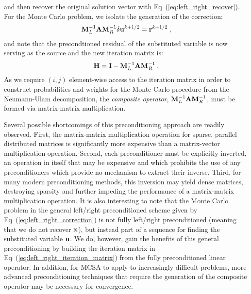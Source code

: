 and then recover the original solution vector with
Eq~(\ref{eq:left_right_recover}). For the Monte Carlo problem, we
isolate the generation of the correction:
\begin{equation}
  \mathbf{M}_L^{-1}\mathbf{A}\mathbf{M}_R^{-1}\delta\mathbf{u}^{k+1/2} = \mathbf{r}^{k+1/2}\:,
  \label{eq:left_right_correction}
\end{equation}
and note that the precondtioned residual of the substituted variable
is now serving as the source and the new iteration matrix is:
\begin{equation}
  \mathbf{H} = \mathbf{I} - \mathbf{M}_L^{-1}\mathbf{A}\mathbf{M}_R^{-1}\:.
  \label{eq:left_right_iteration_matrix}
\end{equation}
As we require $(i,j)$ element-wise access to the iteration matrix in
order to construct probabilities and weights for the Monte Carlo
procedure from the Neumann-Ulam decomposition, the \textit{composite
  operator}, $\mathbf{M}_L^{-1}\mathbf{A}\mathbf{M}_R^{-1}$, must be formed via
matrix-matrix multiplication. 

Several possible shortcomings of this preconditioning approach are
readily observed. First, the matrix-matrix multiplication operation
for sparse, parallel distributed matrices is significantly more
expensive than a matrix-vector multiplication operation. Second, each
preconditioner must be explicitly inverted, an operation in itself
that may be expensive and which prohibits the use of any
preconditioners which provide no mechanism to extract their
inverse. Third, for many modern preconditioning methods, this
inversion may yield dense matrices, destroying sparsity and further
impeding the performance of a matrix-matrix multiplication
operation. It is also interesting to note that the Monte Carlo problem
in the general left/right preconditioned scheme given by
Eq~(\ref{eq:left_right_correction}) is not fully left/right
preconditioned (meaning that we do not recover $\mathbf{x}$), but instead
part of a sequence for finding the substituted variable $\mathbf{u}$. We
do, however, gain the benefits of this general preconditioning by
building the iteration matrix in
Eq~(\ref{eq:left_right_iteration_matrix}) from the fully
preconditioned linear operator. In addition, for MCSA to apply to
increasingly difficult problems, more advanced preconditioning
techniques that require the generation of the composite operator may
be necessary for convergence.

